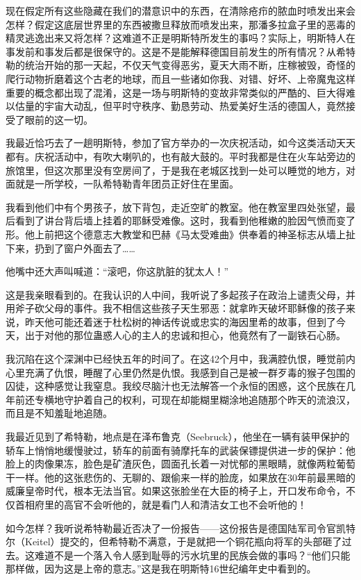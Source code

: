 \documentclass[UTF8]{ctexart}
\begin{document}
现在假定所有这些隐藏在我们的潜意识中的东西，在清除疮疖的脓血时喷发出来会怎样？假定这底层世界里的东西被撒旦释放而喷发出来，那潘多拉盒子里的恶毒的精灵逃逸出来又将怎样？这难道不正是明斯特所发生的事吗？实际上，明斯特人在事发前和事发后都是很保守的。这是不是能解释德国目前发生的所有情况？从希特勒的统治开始的那一天起，不仅天气变得恶劣，夏天大雨不断，庄稼被毁，奇怪的爬行动物折磨着这个古老的地球，而且一些诸如你我、对错、好坏、上帝魔鬼这样重要的概念都出现了混淆，这是一场与明斯特的变故非常类似的严酷的、巨大得难以估量的宇宙大动乱，但平时守秩序、勤恳劳动、热爱美好生活的德国人，竟然接受了眼前的这一切。

我最近恰巧去了一趟明斯特，参加了官方举办的一次庆祝活动，如今这类活动天天都有。庆祝活动中，有吹大喇叭的，也有敲大鼓的。平时我都是住在火车站旁边的旅馆里，但这次那里没有空房间了，于是我在老城区找到一处可以睡觉的地方，对面就是一所学校，一队希特勒青年团员正好住在里面。

我看到他们中有个男孩子，放下背包，走近空旷的教室。他在教室里四处张望，最后看到了讲台背后墙上挂着的耶稣受难像。这时，我看到他稚嫩的脸因气愤而变了形。他上前把这个德意志大教堂和巴赫《马太受难曲》供奉着的神圣标志从墙上扯下来，扔到了窗户外面去了……

他嘴中还大声叫喊道：“滚吧，你这肮脏的犹太人！”

这是我亲眼看到的。在我认识的人中间，我听说了多起孩子在政治上谴责父母，并用斧子砍父母的事件。我不相信这些孩子天生邪恶：就拿昨天破坏耶稣像的孩子来说，昨天他可能还着迷于杜松树的神话传说或忠实的海因里希的故事，但到了今天，出于对他的那位蛊惑人心的主人的忠诚和担心，他竟然有了一副铁石心肠。

我沉陷在这个深渊中已经快五年的时间了。在这42个月中，我满腔仇恨，睡觉前内心里充满了仇恨，睡醒了心里仍然是仇恨。我感到自己是被一群歹毒的猴子包围的囚徒，这种感觉让我窒息。我绞尽脑汁也无法解答一个永恒的困惑，这个民族在几年前还专横地守护着自己的权利，可现在却能糊里糊涂地追随那个昨天的流浪汉，而且是不知羞耻地追随。

我最近见到了希特勒，地点是在泽布鲁克（Seebruck），他坐在一辆有装甲保护的轿车上悄悄地缓慢驶过，轿车的前面有骑摩托车的武装保镖提供进一步的保护：他脸上的肉像果冻，脸色是矿渣灰色，圆面孔长着一对忧郁的黑眼睛，就像两粒葡萄干一样。他的这张悲伤的、无聊的、跟偷来一样的脸庞，如果放在30年前最黑暗的威廉皇帝时代，根本无法当官。如果这张脸坐在大臣的椅子上，开口发布命令，不仅首相府里的高官不会听他的，就是看门人和清洁女工也不会听他的！

如今怎样？我听说希特勒最近否决了一份报告——这份报告是德国陆军司令官凯特尔（Keitel）提交的，但希特勒不满意，于是就把一个铜花瓶向将军的头部砸了过去。这难道不是一个落入令人感到耻辱的污水坑里的民族会做的事吗？“他们只能那样做，因为这是上帝的意志。”这是我在明斯特16世纪编年史中看到的。
\end{document}

